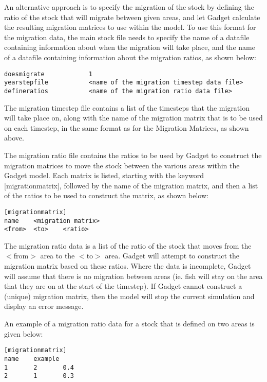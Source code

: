 \documentclass[]{book}
\begin{document}
An alternative approach is to specify the migration of the stock by
defining the ratio of the stock that will migrate between given areas,
and let Gadget calculate the resulting migration matrices to use within
the model. To use this format for the migration data, the main stock
file needs to specify the name of a datafile containing information
about when the migration will take place, and the name of a datafile
containing information about the migration ratios, as shown below:

\begin{verbatim}
doesmigrate            1
yearstepfile           <name of the migration timestep data file>
defineratios           <name of the migration ratio data file>
\end{verbatim}

The migration timestep file contains a list of the timesteps that the
migration will take place on, along with the name of the migration
matrix that is to be used on each timestep, in the same format as for
the Migration Matrices, as shown above.

The migration ratio file contains the ratios to be used by Gadget to
construct the migration matrices to move the stock between the various
areas within the Gadget model. Each matrix is listed, starting with the
keyword {[}migrationmatrix{]}, followed by the name of the migration
matrix, and then a list of the ratios to be used to construct the
matrix, as shown below:

\begin{verbatim}
[migrationmatrix]
name    <migration matrix>
<from>  <to>    <ratio>
\end{verbatim}

The migration ratio data is a list of the ratio of the stock that moves
from the \(<\)from\(>\) area to the \(<\)to\(>\) area. Gadget will attempt to
construct the migration matrix based on these ratios. Where the data is
incomplete, Gadget will assume that there is no migration between areas
(ie. fish will stay on the area that they are on at the start of the
timestep). If Gadget cannot construct a (unique) migration matrix, then
the model will stop the current simulation and display an error message.

An example of a migration ratio data for a stock that is defined on two
areas is given below:

\begin{verbatim}
[migrationmatrix]
name    example
1       2       0.4
2       1       0.3
\end{verbatim}
\end{document}
